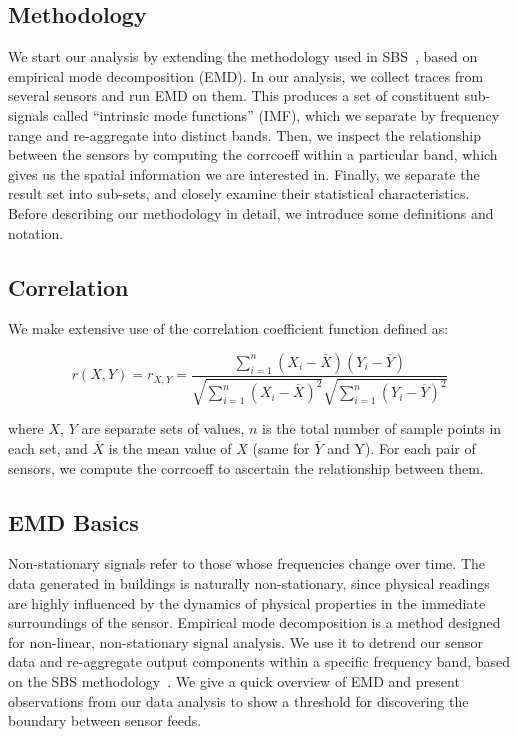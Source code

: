 \subsection{Methodology}
We start our analysis by extending the methodology used in SBS~\cite{SBS}, based on empirical mode decomposition (EMD).  
In our analysis, we collect traces from several sensors and run EMD on them.  This produces a set of 
constituent sub-signals called ``intrinsic mode functions'' (IMF), which we separate by frequency range and re-aggregate into distinct bands.
Then, we inspect the relationship between the sensors by computing the corrcoeff within a particular band, which 
gives us the spatial information we are interested in. 
Finally, we separate the result set into sub-sets, and closely examine their statistical characteristics. 
Before describing our methodology in detail, we introduce some definitions and notation.



\subsection{Correlation}
We make extensive use of the correlation coefficient function defined as: 

\begin{displaymath}
r(X,Y) = r_{X, Y} = \frac{\sum_{i=1}^{n} (X_{i} - \overline{X})(Y_{i} - \overline{Y})}
{\sqrt{\sum_{i=1}^{n} (X_{i} - \overline{X})^2}\sqrt{\sum_{i=1}^{n} (Y_{i} - \overline{Y})^2}}
\end{displaymath}

where $X$, $Y$ are separate sets of values, $n$ is the total number of sample points in 
each set, and $\overline{X}$ is the mean value of $X$ (same for $\overline{Y}$ and Y).  %
For each pair of sensors, we compute the corrcoeff to ascertain the relationship between them.


\subsection{EMD Basics}
Non-stationary signals refer to those whose frequencies change over time.  The data generated in buildings is naturally non-stationary, since 
physical readings are highly influenced by the dynamics of physical properties in the immediate surroundings of the sensor.  
 Empirical mode decomposition \cite{EMD} is a method designed for non-linear, non-stationary signal analysis.  We use it to detrend our 
 sensor data and re-aggregate output components within a specific frequency band, based on the SBS methodology~\cite{SBS}. We give a quick overview of EMD and present observations from our data analysis to show a threshold for discovering the boundary between sensor feeds.

